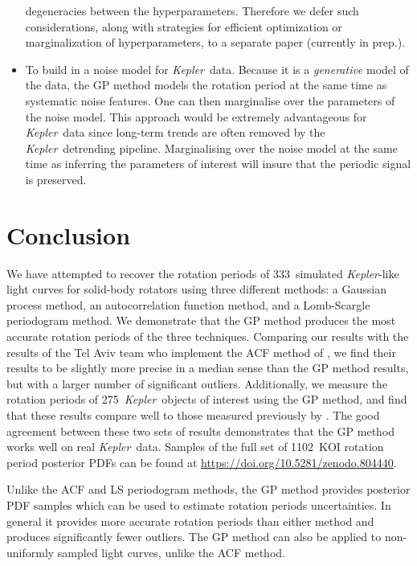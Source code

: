 \documentclass[a4paper,fleqn,usenatbib,useAMS]{mnras}
\newcommand{\Kepler}{{\it Kepler}}
\newcommand{\kepler}{\Kepler}
\newcommand{\nkoi}{1102}
\newcommand{\naigrain}{333}
\newcommand{\nkoimcq}{275}
\begin{document}
\begin{itemize}
{        degeneracies between the hyperparameters.
        Therefore we defer such considerations, along with strategies for
        efficient optimization or marginalization of hyperparameters, to a
        separate paper (currently in prep.).}
\item{To build in a noise model for \kepler\ data.
        Because it is a {\it generative} model of the data, the GP method
        models the rotation period at the same time as systematic noise
        features.  One can then marginalise over the parameters of the noise
        model.
        This approach would be extremely advantageous for \kepler\ data since
        long-term trends are often removed by the \kepler\ detrending
        pipeline.  Marginalising over the noise model at the same time as
        inferring the parameters of interest will insure that the periodic
        signal is preserved.}
\end{itemize}

\section{Conclusion}

We have attempted to recover the rotation periods of \naigrain\ simulated
\kepler-like light curves for solid-body rotators \citep{Aigrain2015} using
three different methods: a Gaussian process method,
an autocorrelation function method, and a Lomb-Scargle periodogram method.
We demonstrate that the GP method produces the most accurate rotation periods
of the three techniques.
Comparing our results with the results of the \citet{Aigrain2015} Tel Aviv
team who implement the ACF method of \citet{Mcquillan2013},
we find their results to be
slightly more precise in a median sense than the GP method results, but with
a larger number of significant outliers.
Additionally, we measure the rotation periods of \nkoimcq\
\kepler\ objects of interest
using the GP method, and find that these results compare well to those
measured previously by \citet{Mcquillan2013}.
The good agreement between these two sets of results demonstrates that the GP
method works well on real \kepler\ data.
Samples of the full set of \nkoi\ KOI rotation period posterior PDFs can be
found at \url{https://doi.org/10.5281/zenodo.804440}.

Unlike the ACF and LS periodogram methods, the GP method provides posterior
PDF samples which can be used to estimate rotation periods uncertainties.
In general it provides more accurate rotation periods than either method and
produces significantly fewer outliers.
The GP method can also be applied to non-uniformly sampled light curves,
unlike the ACF method.
\end{document}
